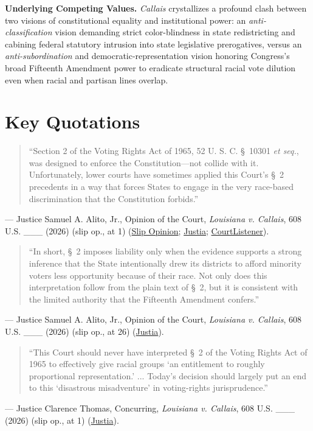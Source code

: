 \documentclass[12pt]{article}
\begin{document}
\textbf{Underlying Competing Values.} \textit{Callais} crystallizes a profound clash between two visions of constitutional equality and institutional power: an \textit{anti-classification} vision demanding strict color-blindness in state redistricting and cabining federal statutory intrusion into state legislative prerogatives, versus an \textit{anti-subordination} and democratic-representation vision honoring Congress's broad Fifteenth Amendment power to eradicate structural racial vote dilution even when racial and partisan lines overlap.

\section{Key Quotations}

\begin{quote}
``Section 2 of the Voting Rights Act of 1965, 52 U. S. C. \S~10301 \textit{et seq.}, was designed to enforce the Constitution---not collide with it. Unfortunately, lower courts have sometimes applied this Court's \S~2 precedents in a way that forces States to engage in the very race-based discrimination that the Constitution forbids.''
\end{quote}
\noindent --- Justice Samuel A. Alito, Jr., Opinion of the Court, \textit{Louisiana v. Callais}, 608 U.S. \_\_\_ (2026) (slip op., at 1) (\href{https://www.supremecourt.gov/opinions/25pdf/24-109_21o3.pdf}{Slip Opinion}; \href{https://supreme.justia.com/cases/federal/us/608/24-109/}{Justia}; \href{https://www.courtlistener.com/opinion/10852760/louisiana-v-callais-revisions-50426/}{CourtListener}).

\begin{quote}
``In short, \S~2 imposes liability only when the evidence supports a strong inference that the State intentionally drew its districts to afford minority voters less opportunity because of their race. Not only does this interpretation follow from the plain text of \S~2, but it is consistent with the limited authority that the Fifteenth Amendment confers.''
\end{quote}
\noindent --- Justice Samuel A. Alito, Jr., Opinion of the Court, \textit{Louisiana v. Callais}, 608 U.S. \_\_\_ (2026) (slip op., at 26) (\href{https://supreme.justia.com/cases/federal/us/608/24-109/}{Justia}).

\begin{quote}
``This Court should never have interpreted \S~2 of the Voting Rights Act of 1965 to effectively give racial groups `an entitlement to roughly proportional representation.' ... Today's decision should largely put an end to this `disastrous misadventure' in voting-rights jurisprudence.''
\end{quote}
\noindent --- Justice Clarence Thomas, Concurring, \textit{Louisiana v. Callais}, 608 U.S. \_\_\_ (2026) (slip op., at 1) (\href{https://supreme.justia.com/cases/federal/us/608/24-109/}{Justia}).
\end{document}

